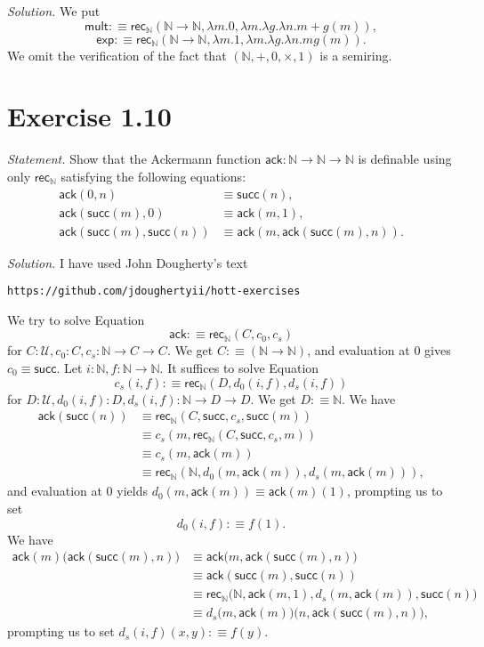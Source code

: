 \documentclass[12pt]{article}
\newcommand{\msf}{\mathsf}
\newcommand{\ack}{\mathsf{ack}}
\newcommand{\la}{\lambda}
\newcommand{\N}{\mathbb N}
\newcommand{\nn}{\noindent}
\newcommand{\rec}{\mathsf{rec}}
\newcommand{\su}{\mathsf{succ}}
\newcommand{\U}{\mathcal U}
\begin{document}
\nn\emph{Solution.} We put
$$
\msf{mult}:\equiv\rec_\N(\N\to\N,\la m.0,\la m.\la g.\la n.m+g(m)),
$$
$$
\msf{exp}:\equiv\rec_\N(\N\to\N,\la m.1,\la m.\la g.\la n.mg(m)).
$$ 
We omit the verification of the fact that $(\N,+,0,\times,1)$ is a semiring.


\section{Exercise 1.10}

\emph{Statement.} Show that the Ackermann function $\ack :\N\to\N\to\N$ is definable using only $\rec_\N$ satisfying the following equations:
\begin{align*}
\ack(0,n)&\equiv\su(n),\\
\ack(\su(m),0)&\equiv\ack(m,1),\\
\ack(\su(m),\su(n))&\equiv\ack(m,\ack(\su(m),n)).
\end{align*}

\nn\emph{Solution.} I have used John Dougherty's text 

\nn\verb"https://github.com/jdoughertyii/hott-exercises"

We try to solve Equation 
\begin{equation}\label{ack1}
\ack:\equiv\rec_\N(C,c_0,c_s)
\end{equation}
for $C:\U,c_0:C,c_s:\N\to C\to C$. We get $C:\equiv(\N\to\N)$, and evaluation at 0 gives $c_0\equiv\su$. Let $i:\N,f:\N\to\N$. It suffices to solve Equation 
\begin{equation}\label{ack2}
c_s(i,f):\equiv\rec_\N(D,d_0(i,f),d_s(i,f))
\end{equation}
for $D:\U,d_0(i,f):D,d_s(i,f):\N\to D\to D$. We get $D:\equiv\N$. We have
\begin{align*}
\ack(\su(n))&\equiv\rec_\N(C,\su,c_s,\su(m))\\
&\equiv c_s(m,\rec_\N(C,\su,c_s,m))\\
&\equiv c_s(m,\ack(m))\\
&\equiv\rec_\N(\N,d_0(m,\ack(m)),d_s(m,\ack(m))),
\end{align*}
and evaluation at 0 yields $d_0(m,\ack(m))\equiv\ack(m)(1)$, prompting us to set $$d_0(i,f):\equiv f(1).$$ We have 
\begin{align*}
\ack(m)\big(\ack(\su(m),n)\big)&\equiv\ack\big(m,\ack(\su(m),n)\big)\\ 
&\equiv\ack(\su(m),\su(n))\\ 
&\equiv\rec_\N\big(\N,\ack(m,1),d_s(m,\ack(m)),\su(n)\big)\\
&\equiv d_s\big(m,\ack(m)\big)\big(n,\ack(\su(m),n)\big),
\end{align*}
prompting us to set $d_s(i,f)(x,y):\equiv f(y)$. 
\end{document}
